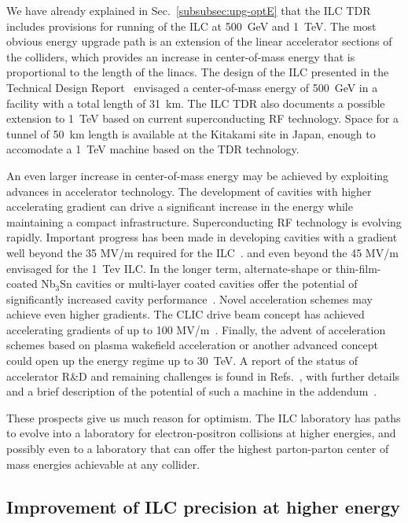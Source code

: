 We have already explained 
 in 
Sec.~\ref{subsubsec:upg-optE} that the ILC TDR includes provisions for
running of the  ILC at  500~GeV and 1~TeV. 
The most obvious energy upgrade path is an extension of the linear
accelerator sections of the colliders, which provides an increase
in center-of-mass energy that is proportional to the length of the linacs.
The design of the ILC presented in the Technical Design
Report~\cite{Behnke:2013xla,Adolphsen:2013jya,Adolphsen:2013kya} envisaged a
center-of-mass energy of 500~GeV{} in a facility with a total length
of 31~km.
The ILC TDR also documents
a possible extension to 1~TeV based on current superconducting RF
technology.   Space for a tunnel of  50~km length  is available at the Kitakami site in
Japan, enough to accomodate a 1~TeV machine based on  the TDR
technology. 

An even larger increase in center-of-mass energy may be achieved by
exploiting advances in accelerator technology. The development of
cavities with higher accelerating gradient can drive a significant
increase in the energy while maintaining a compact infrastructure.
Superconducting RF technology is evolving rapidly. Important
progress has been made in developing cavities with a gradient well
beyond the 35 MV/m required for 
the ILC~\cite{Grassellino:2018tqg,Grassellino:2017bod}.
and even beyond the 45 MV/m envisaged for
 the 1~Tev{} ILC.     In the longer term, alternate-shape
or thin-film-coated Nb$_3$Sn cavities
 or multi-layer coated cavities offer the potential of
significantly increased cavity performance~\cite{Adolphsen:2013jya}.
Novel acceleration schemes may achieve even higher gradients. 
The CLIC drive beam concept has
achieved accelerating gradients of up to 100 MV/m~\cite{Aicheler:2012bya}.
Finally, the advent of acceleration schemes based on plasma
wakefield 
acceleration or another advanced concept could 
open up the energy regime up to 30~TeV. A report of the status of accelerator R\&D and remaining
challenges is found in Refs.~\cite{Cros:2017jxp,Cros:2019tns}, with further details and
a brief description of the potential of such a machine in the
addendum~\cite{ALEGRO:2019alc}.

These prospects give us much reason for optimism.  The ILC laboratory
has  paths to evolve into a laboratory for electron-positron
collisions at higher energies, and possibly even to a laboratory that
can offer the highest parton-parton center of mass energies
achievable at any collider. 


\subsection{Improvement of ILC precision at higher energy}
\label{subsec:highE:physics}

